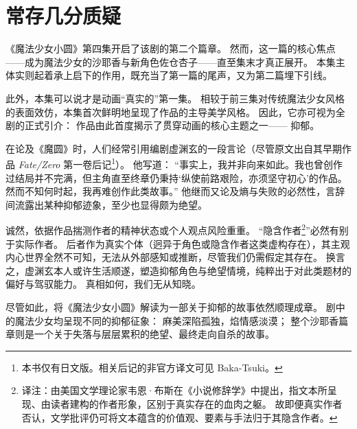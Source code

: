 \chapter[常存几分质疑]{常存几分质疑}



《魔法少女小圆》第四集开启了该剧的第二个篇章。
然而，这一篇的核心焦点——成为魔法少女的沙耶香与新角色佐仓杏子——直至集末才真正展开。
本集主体实则起着承上启下的作用，既充当了第一篇的尾声，又为第二篇埋下引线。

此外，本集可以说才是动画“真实的”第一集。
相较于前三集对传统魔法少女风格的表面效仿，本集首次鲜明地呈现了作品的主导美学风格。
因此，它亦可视为全剧的正式引介：
作品由此首度揭示了贯穿动画的核心主题之一——
抑郁。

在论及《魔圆》时，人们经常引用编剧虚渊玄的一段言论（尽管原文出自其早期作品 \emph{Fate/Zero} 第一卷后记\footnote{%
    本书仅有日文版。相关后记的非官方译文可见 Baka-Tsuki。
}）。
他写道：
“事实上，我并非向来如此。我也曾创作过结局并不完满，但主角直至终章仍秉持‘纵使前路艰险，亦须坚守初心’的作品。然而不知何时起，我再难创作此类故事。”\cite{urobuchi2006fate-zero}
他继而又论及熵与失败的必然性，言辞间流露出某种抑郁迹象，至少也显得颇为绝望。

诚然，依据作品揣测作者的精神状态或个人观点风险重重。
“隐含作者\footnote{%
    译注：由美国文学理论家韦恩·布斯在《小说修辞学》中提出，指文本所呈现、由读者建构的作者形象，区别于真实存在的血肉之躯。
    故即便真实作者否认，文学批评仍可将文本蕴含的价值观、要素与手法归于其隐含作者。
}”必然有别于实际作者\cite{booth1961rhetoric-fiction}。
后者作为真实个体（迥异于角色或隐含作者这类虚构存在），其主观内心世界全然不可知，无法从外部感知或推断，尽管我们仍需假定其存在。
换言之，虚渊玄本人或许生活顺遂，塑造抑郁角色与绝望情境，纯粹出于对此类题材的偏好与驾驭能力。
真相如何，我们无从知晓。

尽管如此，将《魔法少女小圆》解读为一部关于抑郁的故事依然顺理成章。
剧中的魔法少女均呈现不同的抑郁征象：
麻美深陷孤独，焰情感淡漠；
整个沙耶香篇章则是一个关于失落与层层累积的绝望、最终走向自杀的故事。

